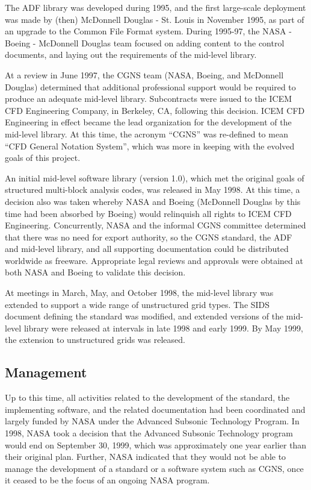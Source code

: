 The ADF library was developed during 1995, and the first large-scale
deployment was made by (then) McDonnell Douglas - St. Louis in November
1995, as part of an upgrade to the Common File Format system.
During 1995-97, the NASA - Boeing - McDonnell Douglas team focused on
adding content to the control documents, and laying out the requirements
of the mid-level library.

At a review in June 1997, the CGNS team (NASA, Boeing, and McDonnell
Douglas) determined that additional professional support would be
required to produce an adequate mid-level library.
Subcontracts were issued to the ICEM
CFD Engineering Company, in Berkeley, CA, following this decision.
ICEM CFD Engineering in effect became the lead organization for the
development of the mid-level library.
At this time, the acronym ``CGNS'' was re-defined to mean ``CFD General
Notation System'', which was more in keeping with the evolved goals of
this project.

An initial mid-level software library (version 1.0), which met the
original goals of structured multi-block analysis codes, was released
in May 1998.
At this time, a decision also was taken whereby NASA and Boeing
(McDonnell Douglas by this time had been absorbed by Boeing) would
relinquish all rights to ICEM CFD Engineering.
Concurrently, NASA and the informal CGNS committee determined that there
was no need for export authority, so the CGNS standard, the ADF and
mid-level library, and all supporting documentation could be distributed
worldwide as freeware.
Appropriate legal reviews and approvals were obtained at both NASA and
Boeing to validate this decision.

At meetings in March, May, and October 1998, the mid-level library was
extended to support a wide range of unstructured grid types.
The SIDS document defining the standard was modified, and extended
versions of the mid-level library were released at intervals in late
1998 and early 1999.
By May 1999, the extension to unstructured grids was released.

\subsection{Management}
\label{s:management}

Up to this time, all activities related to the development of the
standard, the implementing software, and the related documentation had
been coordinated and largely funded by NASA under the Advanced Subsonic
Technology Program.
In 1998, NASA took a decision that the Advanced Subsonic Technology
program would end on September 30, 1999, which was approximately one
year earlier than their original plan.
Further, NASA indicated that they would not be able to manage the
development of a standard or a software system such as CGNS, once it
ceased to be the focus of an ongoing NASA program.

